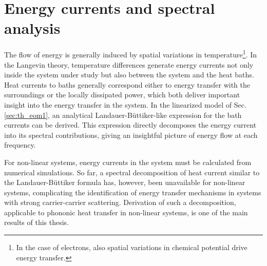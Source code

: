 \section{Energy currents and spectral analysis}
\label{sec:th_currents}

The flow of energy is generally induced by spatial variations in temperature\footnote{In the case of electrons, also spatial variations in chemical potential drive energy transfer.}. In the Langevin theory, temperature differences generate energy currents not only inside the system under study but also between the system and the heat baths. Heat currents to baths generally correspond either to energy transfer with the surroundings or the locally dissipated power, which both deliver important insight into the energy transfer in the system. In the linearized model of Sec. \ref{sec:th_eom1}, an analytical Landauer-B\"uttiker-like expression for the bath currents can be derived. This expression directly decomposes the energy current into its spectral contributions, giving an insightful picture of energy flow at each frequency.

For non-linear systems, energy currents in the system must be calculated from numerical simulations. So far, a spectral decomposition of heat current similar to the Landauer-B\"uttiker formula has, however, been unavailable for non-linear systems, complicating the identification of energy transfer mechanisms in systems with strong carrier-carrier scattering. Derivation of such a decomposition, applicable to phononic heat transfer in non-linear systems, is one of the main results of this thesis.

